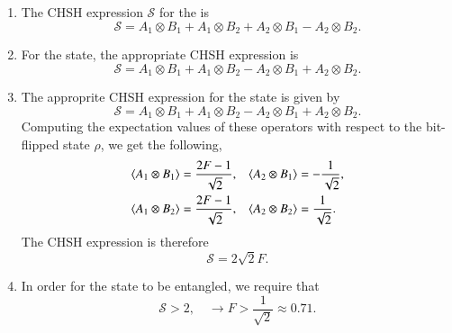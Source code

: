 \begin{solution}
\begin{enumerate}[label=(\alph*)]
    \item The CHSH expression $\mathcal{S}$ for the \ket{\Phi^+} is
    \begin{equation*}
        \mathcal{S} = A_1\otimes B_1 + A_1\otimes B_2 + A_2\otimes B_1 - A_2\otimes B_2.
    \end{equation*}
    \item For the \ket{\Phi^-} state, the appropriate CHSH expression is
    \begin{equation*}
        \mathcal{S} = A_1\otimes B_1 + A_1\otimes B_2 - A_2\otimes B_1 + A_2\otimes B_2.
    \end{equation*}
    \item The approprite CHSH expression for the \ket{\Phi^+} state is given by
    \begin{equation*}
        \mathcal{S} = A_1\otimes B_1 + A_1\otimes B_2 - A_2\otimes B_1 + A_2\otimes B_2.
    \end{equation*}
    Computing the expectation values of these operators with respect to the bit-flipped state $\rho$, we get the following,
    \begin{align*}
        \langle A_1 \otimes B_1 \rangle & = \frac{2F-1}{\sqrt{2}}, & \langle A_2 \otimes B_1 \rangle & = -\frac{1}{\sqrt{2}}, \\
        \langle A_1 \otimes B_2 \rangle & = \frac{2F-1}{\sqrt{2}}, & \langle A_2 \otimes B_2 \rangle & = \frac{1}{\sqrt{2}}.
    \end{align*}
    The CHSH expression is therefore
    \begin{equation*}
        \mathcal{S} = 2\sqrt{2} F.
    \end{equation*}
    \item In order for the state to be entangled, we require that
    \begin{equation*}
        \mathcal{S} > 2, \quad \rightarrow F > \frac{1}{\sqrt{2}} \approx 0.71.
    \end{equation*}
\end{enumerate}
\end{solution}

